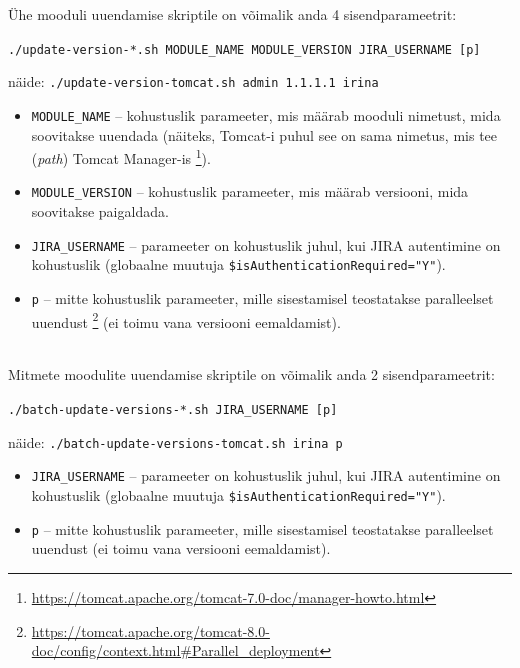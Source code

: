 \documentclass[12pt]{report}
\newcommand{\code}[1]{\texttt{#1}}
\begin{document}
  Ühe mooduli uuendamise skriptile on võimalik anda 4 sisendparameetrit:
  \begin{center}
    \small{\code{./update-version-*.sh MODULE\_NAME MODULE\_VERSION JIRA\_USERNAME [p]}}
  \end{center}

  \begin{center}
    \small{näide: \code{./update-version-tomcat.sh admin 1.1.1.1 irina}}
  \end{center}
  
  \newpage

  \begin{itemize}
    \item \code{MODULE\_NAME} \--- kohustuslik parameeter, mis määrab mooduli nimetust, mida soovitakse uuendada (näiteks, Tomcat-i puhul see on sama nimetus, mis tee (\textit{path}) Tomcat Manager-is \footnote{\url{https://tomcat.apache.org/tomcat-7.0-doc/manager-howto.html}}).
    \item \code{MODULE\_VERSION} \--- kohustuslik parameeter, mis määrab versiooni, mida soovitakse paigaldada.
    \item \code{JIRA\_USERNAME} \--- parameeter on kohustuslik juhul, kui JIRA autentimine on kohustuslik (globaalne muutuja \code{\$isAuthenticationRequired="Y"}).
    \item \code{p} \--- mitte kohustuslik parameeter, mille sisestamisel teostatakse paralleelset uuendust \footnote{\url{https://tomcat.apache.org/tomcat-8.0-doc/config/context.html\#Parallel\_deployment}} (ei toimu vana versiooni eemaldamist).
  \end{itemize}\\
  
  Mitmete moodulite uuendamise skriptile on võimalik anda 2 sisendparameetrit:
  
  \begin{center}
    \small{\code{./batch-update-versions-*.sh JIRA\_USERNAME [p]}}
  \end{center}
  
  \begin{center}
    \small{näide: \code{./batch-update-versions-tomcat.sh irina p}}
  \end{center}
  
  \begin{itemize}
    \item \code{JIRA\_USERNAME} \--- parameeter on kohustuslik juhul, kui JIRA autentimine on kohustuslik (globaalne muutuja \code{\$isAuthenticationRequired="Y"}).
    \item \code{p} \--- mitte kohustuslik parameeter, mille sisestamisel teostatakse paralleelset uuendust (ei toimu vana versiooni eemaldamist).
  \end{itemize}
  
\end{document}
